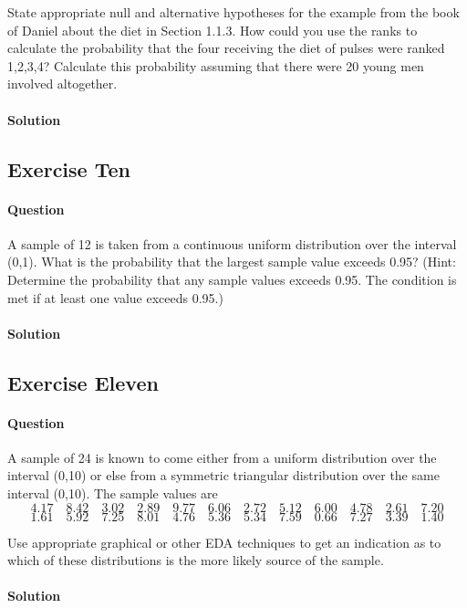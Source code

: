 \documentclass[]{article}
\let\oldparagraph\paragraph
\renewcommand{\paragraph}[1]{\oldparagraph{#1}\mbox{}}
\begin{document}
State appropriate null and alternative hypotheses for the example from
the book of Daniel about the diet in Section 1.1.3. How could you use
the ranks to calculate the probability that the four receiving the diet
of pulses were ranked 1,2,3,4? Calculate this probability assuming that
there were 20 young men involved altogether.

\paragraph{Solution}\label{solution-8}

\subsection{Exercise Ten}\label{exercise-ten}

\paragraph{Question}\label{question-9}

A sample of 12 is taken from a continuous uniform distribution over the
interval (0,1). What is the probability that the largest sample value
exceeds 0.95? (Hint: Determine the probability that any sample values
exceeds 0.95. The condition is met if at least one value exceeds 0.95.)

\paragraph{Solution}\label{solution-9}

\subsection{Exercise Eleven}\label{exercise-eleven}

\paragraph{Question}\label{question-10}

A sample of 24 is known to come either from a uniform distribution over
the interval (0,10) or else from a symmetric triangular distribution
over the same interval (0,10). The sample values are \[
4.17\quad8.42\quad3.02\quad2.89\quad9.77\quad6.06\quad2.72\quad5.12\quad6.00\quad4.78\quad2.61\quad7.20 \]
\[ 1.61\quad5.92\quad7.25\quad8.01\quad4.76\quad5.36\quad5.34\quad7.59\quad0.66\quad7.27\quad3.39\quad1.40
\]

Use appropriate graphical or other EDA techniques to get an indication
as to which of these distributions is the more likely source of the
sample.

\paragraph{Solution}\label{solution-10}
\end{document}
